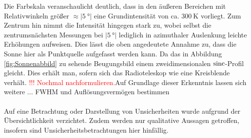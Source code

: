     Die Farbskala veranschaulicht deutlich, dass in den äußeren Bereichen mit Relativwinkeln größer $\approx \vert \SI{5}{\degree}\vert$ eine Grundintensität von ca. $\SI{300}{\kelvin}$ vorliegt.
    Zum Zentrum hin nimmt die Intensität hingegen stark zu,
    wobei selbst die zentrumsnächsten Messungen bei $\vert\SI{5}{\degree}\vert$ lediglich in azimuthaler Auslenkung leichte Erhöhungen aufweisen.
    Dies lässt die oben angedeutete Annahme zu, dass die Sonne hier als Punktquelle aufgefasst werden kann. 
    Da das in Abbildung \ref{fig:Sonnenabbild} zu sehende Beugungsbild einem zweidimensionalen $\operatorname{sinc}$-Profil gleicht.
    Dies erhält man, sofern sich das Radioteleskop wie eine Kreisblende verhält. \textcolor{red}{!!! Nochmal nachformulieren.}Auf Grundlage dieser Erkenntnis lassen sich weitere ... FWHM und Auflösungsvermögen bestimmen\\ 
    \\
    Auf eine Betrachtung oder Darstellung von Unsicherheiten wurde aufgrund der Übersichtlichkeit verzichtet. Zudem werden nur qualitative Aussagen getroffen, insofern sind Unsicherheitsbetrachtungen hier hinfällig.

